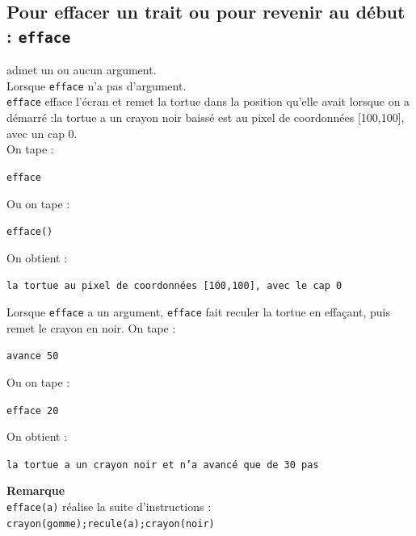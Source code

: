 \documentclass[a4paper,11pt]{book}
\begin{document}
\subsection{Pour effacer un trait ou pour revenir au d\'ebut : {\tt efface}}
 admet un ou aucun argument.\\
Lorsque {\tt efface} n'a pas d'argument.\\
{\tt efface} efface l'\'ecran et remet la tortue dans la position qu'elle avait
lorsque on a d\'emarr\'e :la tortue a un crayon noir baiss\'e est au pixel de 
coordonn\'ees [100,100], avec un cap 0.\\
On tape :
\begin{center}{\tt efface}\end{center}
Ou on tape :
\begin{center}{\tt efface()}\end{center}
On obtient :
\begin{center}{\tt la tortue au pixel de coordonn\'ees [100,100], avec le cap 0}\end{center}
Lorsque {\tt efface} a  un argument, {\tt efface} fait reculer la tortue en
effa\c{c}ant, puis remet le crayon en noir.
On tape :
\begin{center}{\tt avance 50}\end{center}
Ou on tape :
\begin{center}{\tt efface 20}\end{center}
On obtient :
\begin{center}{\tt la tortue a un crayon noir et n'a avanc\'e que de 30 pas}\end{center}
{\bf Remarque}\\
{\tt efface(a)} r\'ealise la suite d'instructions :\\
{\tt crayon(gomme);recule(a);crayon(noir)}
\end{document}
